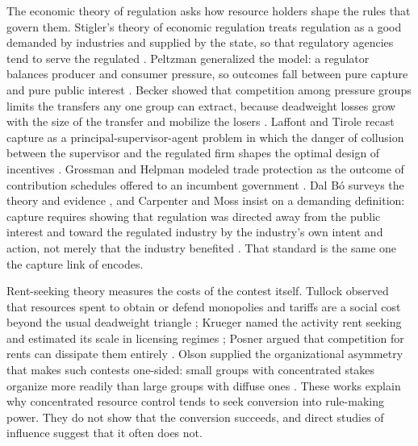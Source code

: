 \documentclass[11pt,letterpaper]{article}
\theoremstyle{definition}
\theoremstyle{remark}
\begin{document}
The economic theory of regulation asks how resource holders shape the rules that govern them. Stigler's theory of economic regulation treats regulation as a good demanded by industries and supplied by the state, so that regulatory agencies tend to serve the regulated \citep{stigler1971}. Peltzman generalized the model: a regulator balances producer and consumer pressure, so outcomes fall between pure capture and pure public interest \citep{peltzman1976}. Becker showed that competition among pressure groups limits the transfers any one group can extract, because deadweight losses grow with the size of the transfer and mobilize the losers \citep{becker1983}. Laffont and Tirole recast capture as a principal-supervisor-agent problem in which the danger of collusion between the supervisor and the regulated firm shapes the optimal design of incentives \citep{laffont1991}. Grossman and Helpman modeled trade protection as the outcome of contribution schedules offered to an incumbent government \citep{grossman1994}. Dal B\'o surveys the theory and evidence \citep{dalbo2006}, and Carpenter and Moss insist on a demanding definition: capture requires showing that regulation was directed away from the public interest and toward the regulated industry by the industry's own intent and action, not merely that the industry benefited \citep{carpentermoss2014}. That standard is the same one the capture link of \citet{largo2026hbs} encodes.

Rent-seeking theory measures the costs of the contest itself. Tullock observed that resources spent to obtain or defend monopolies and tariffs are a social cost beyond the usual deadweight triangle \citep{tullock1967}; Krueger named the activity rent seeking and estimated its scale in licensing regimes \citep{krueger1974}; Posner argued that competition for rents can dissipate them entirely \citep{posner1975}. Olson supplied the organizational asymmetry that makes such contests one-sided: small groups with concentrated stakes organize more readily than large groups with diffuse ones \citep{olson1965}. These works explain why concentrated resource control tends to seek conversion into rule-making power. They do not show that the conversion succeeds, and direct studies of influence suggest that it often does not.
\end{document}

